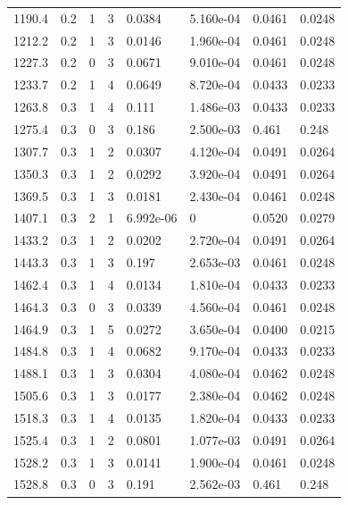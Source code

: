 \documentclass[preview]{standalone}
\begin{document}
{{{\begin{tabular}{L{1.2cm}C{1.2cm} C{0.3cm}C{0.5cm} C{1.4cm}C{1.4cm} C{1.4cm}C{1.4cm}}
  1190.4  &   0.2  & 1     &  3 &  0.0384  & 5.160e-04  & 0.0461 &  0.0248   \\ 
  1212.2  &   0.2  & 1     &  3 &  0.0146  & 1.960e-04  & 0.0461 &  0.0248   \\ 
  1227.3  &   0.2  & 0     &  3 &  0.0671  & 9.010e-04  & 0.0461 &  0.0248   \\ 
  1233.7  &   0.2  & 1     &  4 &  0.0649  & 8.720e-04  & 0.0433 &  0.0233   \\ 
  1263.8  &   0.3  & 1     &  4 &  0.111  & 1.486e-03  & 0.0433 &  0.0233   \\ 
  1275.4  &   0.3  & 0     &  3 &  0.186  & 2.500e-03  & 0.461 &  0.248   \\ 
  1307.7  &   0.3  & 1     &  2 &  0.0307  & 4.120e-04  & 0.0491 &  0.0264   \\ 
  1350.3  &   0.3  & 1     &  2 &  0.0292  & 3.920e-04  & 0.0491 &  0.0264   \\ 
  1369.5  &   0.3  & 1     &  3 &  0.0181  & 2.430e-04  & 0.0461 &  0.0248   \\ 
  1407.1  &   0.3  & 2     &  1 &  6.992e-06  & 0  & 0.0520 &  0.0279   \\ 
  1433.2  &   0.3  & 1     &  2 &  0.0202  & 2.720e-04  & 0.0491 &  0.0264   \\ 
  1443.3  &   0.3  & 1     &  3 &  0.197  & 2.653e-03  & 0.0461 &  0.0248   \\ 
  1462.4  &   0.3  & 1     &  4 &  0.0134  & 1.810e-04  & 0.0433 &  0.0233   \\ 
  1464.3  &   0.3  & 0     &  3 &  0.0339  & 4.560e-04  & 0.0461 &  0.0248   \\ 
  1464.9  &   0.3  & 1     &  5 &  0.0272  & 3.650e-04  & 0.0400 &  0.0215   \\ 
  1484.8  &   0.3  & 1     &  4 &  0.0682  & 9.170e-04  & 0.0433 &  0.0233   \\ 
  1488.1  &   0.3  & 1     &  3 &  0.0304  & 4.080e-04  & 0.0462 &  0.0248   \\ 
  1505.6  &   0.3  & 1     &  3 &  0.0177  & 2.380e-04  & 0.0462 &  0.0248   \\ 
  1518.3  &   0.3  & 1     &  4 &  0.0135  & 1.820e-04  & 0.0433 &  0.0233   \\ 
  1525.4  &   0.3  & 1     &  2 &  0.0801  & 1.077e-03  & 0.0491 &  0.0264   \\ 
  1528.2  &   0.3  & 1     &  3 &  0.0141  & 1.900e-04  & 0.0461 &  0.0248   \\ 
  1528.8  &   0.3  & 0     &  3 &  0.191  & 2.562e-03  & 0.461 &  0.248   \\ 

\end{tabular}}}}
\end{document}
